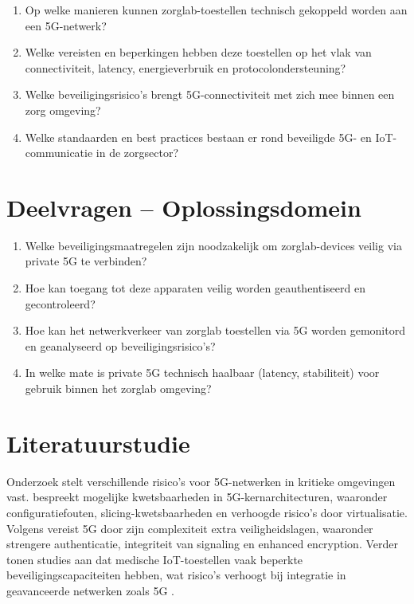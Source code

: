 \begin{enumerate}
	\item Op welke manieren kunnen zorglab-toestellen technisch gekoppeld worden aan een 5G-netwerk?
	\item Welke vereisten en beperkingen hebben deze toestellen op het vlak van connectiviteit, latency, energieverbruik en protocolondersteuning?
	\item Welke beveiligingsrisico's brengt 5G-connectiviteit met zich mee binnen een zorg omgeving?
\end{enumerate}

\clearpage  %

\begin{enumerate}
	\setcounter{enumi}{3}  %
	\item Welke standaarden en best practices bestaan er rond beveiligde 5G- en IoT-communicatie in de zorgsector?
\end{enumerate}

\vspace{1em}

\section{Deelvragen -- Oplossingsdomein}

\begin{enumerate}
	\item Welke beveiligingsmaatregelen zijn noodzakelijk om zorglab-devices veilig via private 5G te verbinden?
	\item Hoe kan toegang tot deze apparaten veilig worden geauthentiseerd  en gecontroleerd?
	\item Hoe kan het netwerkverkeer van zorglab toestellen via 5G worden gemonitord en geanalyseerd op beveiligingsrisico’s?
	\item In welke mate is private 5G technisch haalbaar (latency, stabiliteit) voor gebruik binnen het zorglab omgeving?
\end{enumerate}


\section{Literatuurstudie}%
\label{sec:literatuurstudie}

Onderzoek stelt verschillende risico's voor 5G-netwerken in kritieke omgevingen vast. \textcite{ENISA2022} bespreekt mogelijke kwetsbaarheden in 5G-kernarchitecturen, waaronder configuratiefouten, slicing-kwetsbaarheden en verhoogde risico's door virtualisatie. Volgens \textcite{GSMA2023} vereist 5G door zijn complexiteit extra veiligheidslagen, waaronder strengere authenticatie, integriteit van signaling en enhanced encryption. Verder tonen studies aan dat medische IoT-toestellen vaak beperkte beveiligingscapaciteiten hebben, wat risico's verhoogt bij integratie in geavanceerde netwerken zoals 5G .


